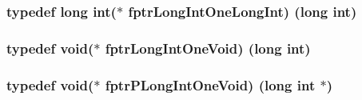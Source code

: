 \subsubsection[{fptr\+Long\+Int\+One\+Long\+Int}]{\setlength{\rightskip}{0pt plus 5cm}typedef long int($\ast$ fptr\+Long\+Int\+One\+Long\+Int) (long int)}\label{group__typedefines_ga2fcac75b66a8e69e0de28880cc60ba7f}
\hypertarget{group__typedefines_ga3bd969ff6cd52b00d54500638dffb379}{}
\subsubsection[{fptr\+Long\+Int\+One\+Void}]{\setlength{\rightskip}{0pt plus 5cm}typedef void($\ast$ fptr\+Long\+Int\+One\+Void) (long int)}\label{group__typedefines_ga3bd969ff6cd52b00d54500638dffb379}
\hypertarget{group__typedefines_ga15b0509ad469369c2107f96d532aa5d5}{}
\subsubsection[{fptr\+P\+Long\+Int\+One\+Void}]{\setlength{\rightskip}{0pt plus 5cm}typedef void($\ast$ fptr\+P\+Long\+Int\+One\+Void) (long int $\ast$)}\label{group__typedefines_ga15b0509ad469369c2107f96d532aa5d5}
